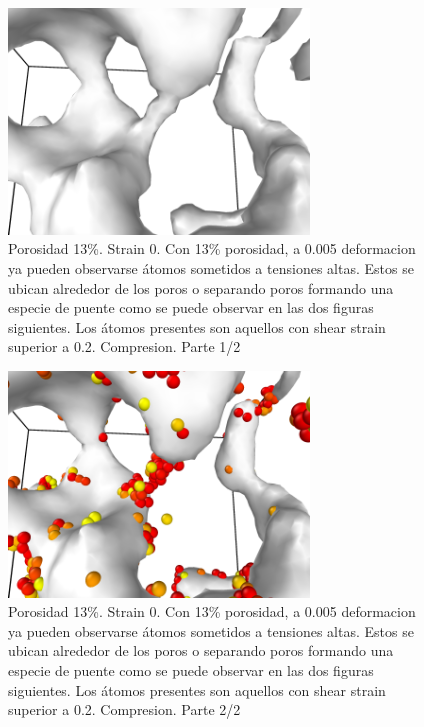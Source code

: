 \documentclass[10pt, oneside]{article} %
\begin{document}
\begin{figure}[H]
\centering
\includegraphics[width=8cm]{Figures/porosidad_13_0_puente.png}
\caption{Porosidad 13\%. Strain 0. Con 13\% porosidad, a 0.005 deformacion ya pueden observarse átomos sometidos a tensiones altas. Estos se ubican alrededor de los poros o separando poros formando una especie de puente como se puede observar en las dos figuras siguientes. Los átomos presentes son aquellos con shear strain superior a 0.2. Compresion. Parte 1/2}
\end{figure}

\begin{figure}[H]
\centering
\includegraphics[width=8cm]{Figures/porosidad_13_0005_puente.png}
\caption{Porosidad 13\%. Strain 0. Con 13\% porosidad, a 0.005 deformacion ya pueden observarse átomos sometidos a tensiones altas. Estos se ubican alrededor de los poros o separando poros formando una especie de puente como se puede observar en las dos figuras siguientes. Los átomos presentes son aquellos con shear strain superior a 0.2. Compresion. Parte 2/2}
\end{figure}
\end{document}

